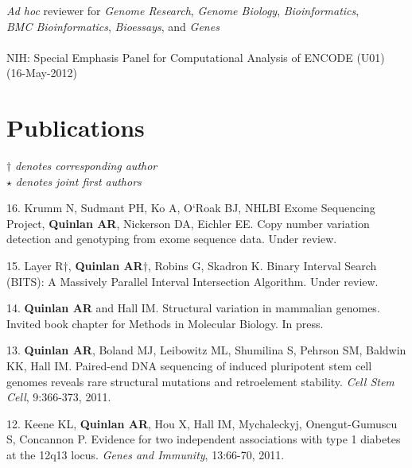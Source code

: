 \documentclass[margin,line]{cv}
\begin{document}
\begin{resume}
    \textit{Ad hoc} reviewer for \textit{Genome Research}, \textit{Genome Biology}, \textit{Bioinformatics}, \\\vspace{1mm}%
    \textit{BMC Bioinformatics}, \textit{Bioessays}, and \textit{Genes}                                      \\\vspace{1mm}%
    \\
    NIH: Special Emphasis Panel for Computational Analysis of ENCODE (U01) (16-May-2012)                                   %
    
    \section{\mysidestyle Publications}
    $\dagger$\textit{ denotes corresponding author}\\
    $\star$\textit{ denotes joint first authors}

    \begin{list}{*}{}
    \item[16.] Krumm N, Sudmant PH, Ko A, O`Roak BJ, NHLBI Exome Sequencing Project, 
    \textbf{Quinlan AR}, Nickerson DA, Eichler EE. 
    Copy number variation detection and genotyping from exome sequence data. Under review.
    
    \item[15.] Layer R$\dagger$, \textbf{Quinlan AR}$\dagger$, Robins G, Skadron K. 
    Binary Interval Search (BITS): A Massively Parallel Interval Intersection Algorithm. 
    Under review.
    
    \item[14.] \textbf{Quinlan AR} and Hall IM. 
    Structural variation in mammalian genomes. Invited book chapter for Methods in Molecular Biology.
    In press.
   
    \item[13.] \textbf{Quinlan AR}, Boland MJ, Leibowitz ML, Shumilina S, Pehrson SM, Baldwin KK, Hall IM. 
    Paired-end DNA sequencing of induced pluripotent stem cell genomes reveals rare structural mutations and retroelement stability. 
    \textit{Cell Stem Cell}, 9:366-373, 2011.
    
    \item[12.] Keene KL, \textbf{Quinlan AR}, Hou X, Hall IM, Mychaleckyj, Onengut-Gumuscu S, Concannon P.
    Evidence for two independent associations with type 1 diabetes at the 12q13 locus. 
    \textit{Genes and Immunity}, 13:66-70, 2011.
    

\end{list}
\end{resume}
\end{document}
